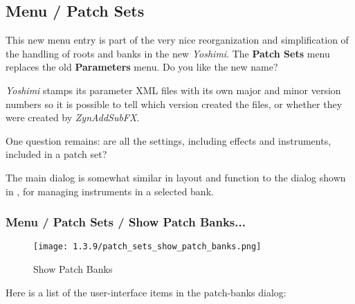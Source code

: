 %
%
%

\subsection{Menu / Patch Sets}
\label{subsubsec:menu_patch_sets}

   This new menu entry is part of the very nice reorganization and
   simplification of the handling of roots and banks in the new
   \textsl{Yoshimi}.  The \textbf{Patch Sets} menu replaces the old
   \textbf{Parameters} menu.  Do you like the new name?

   \textsl{Yoshimi} stamps its parameter XML files with its own major and
   minor version numbers so it is possible to tell which version created the
   files, or whether they were created by \textsl{ZynAddSubFX}.

   One question remains:  are all the settings, including effects and
   instruments, included in a patch set?

   The main dialog is somewhat similar in layout and function to the
   dialog shown in
   ,
   for managing instruments in a selected bank.

\subsubsection{Menu / Patch Sets / Show Patch Banks...}
\label{subsubsec:menu_patch_sets_show_patch_banks}

\begin{figure}[H]
   \centering 
   \texttt{[image: 1.3.9/patch\_sets\_show\_patch\_banks.png]}
   \caption[Show Patch Banks]{Show Patch Banks}
   \label{fig:show_patch_banks}
\end{figure}

   Here is a list of the user-interface items in the patch-banks dialog:

